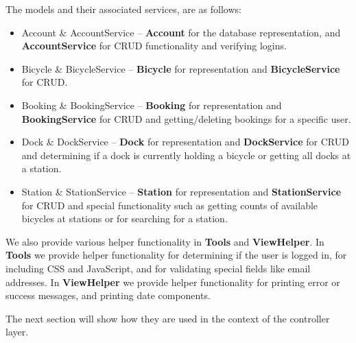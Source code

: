 The models and their associated services, are as follows:

\begin{itemize}
\item Account \& AccountService -- \textbf{Account} for the database representation, and \textbf{AccountService} for CRUD functionality and verifying logins.
\item Bicycle \& BicycleService -- \textbf{Bicycle} for representation and \textbf{BicycleService} for CRUD.
\item Booking \& BookingService -- \textbf{Booking} for representation and \textbf{BookingService} for CRUD and getting/deleting bookings for a specific user.
\item Dock \& DockService -- \textbf{Dock} for representation and \textbf{DockService} for CRUD and determining if a dock is currently holding a bicycle or getting all docks at a station.
\item Station \& StationService -- \textbf{Station} for representation and \textbf{StationService} for CRUD and special functionality such as getting counts of available bicycles at stations or for searching for a station.
\end{itemize}

We also provide various helper functionality in \textbf{Tools} and \textbf{ViewHelper}. 
In \textbf{Tools} we provide helper functionality for determining if the user is logged in, for including CSS and JavaScript, and for validating special fields like email addresses.
In \textbf{ViewHelper} we provide helper functionality for printing error or success messages, and printing date components.

 The next section will show how they are used in the context of the controller layer.